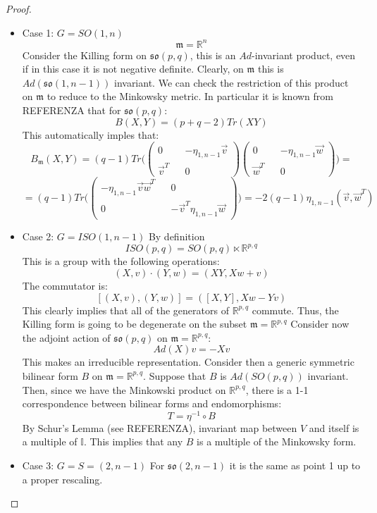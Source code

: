 \documentclass[12pt,a4paper]{report}
\theoremstyle{definition}
\theoremstyle{Theorem}
\theoremstyle{definition}
\theoremstyle{definition}
\begin{document}
	\begin{proof}
		\begin{itemize}
			\item Case 1: $G=SO(1,n)$\\
			$$\mathfrak{m}=\mathbb{R}^n$$
			Consider the Killing form on $\mathfrak{so}(p,q)$, this is an $Ad$-invariant product, even if in this case it is not negative definite. Clearly, on $\mathfrak{m}$ this is $Ad(\mathfrak{so}(1,n-1))$ invariant. We can check the restriction of this product on $\mathfrak{m}$ to reduce to the Minkowsky metric. In particular it is known from REFERENZA that for $\mathfrak{so}(p,q)$:
			$$B(X,Y)=(p+q-2)Tr(XY)$$
			This automatically imples that:
			$$B_\mathfrak{m}(X,Y)=(q-1)Tr\bigg(\begin{pmatrix}
				0 && -\eta_{1,n-1}\vec{v} \\
				\vec{v}^T && 0
			\end{pmatrix}\begin{pmatrix}
			0 && -\eta_{1,n-1}\vec{w} \\
			\vec{w}^T && 0
			\end{pmatrix}\bigg)=$$
			$$=(q-1)Tr\bigg(\begin{pmatrix}
				-\eta_{1,n-1}\vec{v}\vec{w}^T && 0 \\
				0 && -\vec{v}^T\eta_{1,n-1}\vec{w}
			\end{pmatrix}\bigg)=-2(q-1)\eta_{1,n-1}(\vec{v},\vec{w}^T)$$
			\item Case 2: $G=ISO(1,n-1)$
			By definition 
			$$ISO(p,q)=SO(p,q)\ltimes \mathbb{R}^{p,q}$$
			This is a group with the following operations:
			$$(X,v)\cdot (Y,w)=(XY,Xw+v)$$
			The commutator is:			$$[(X,v),(Y,w)]=([X,Y],Xw-Yv)$$
			This clearly implies that all of the generators of $\mathbb{R}^{p,q}$ commute. Thus, the Killing form is going to be degenerate on the subset $\mathfrak{m}=\mathbb{R}^{p,q}$
			Consider now the adjoint action of $\mathfrak{so}(p,q)$ on $\mathfrak{m}=\mathbb{R}^{p,q}$:
			$$Ad(X)v=-Xv$$
			This makes an irreducible representation. Consider then a generic symmetric bilinear form $B$ on $\mathfrak{m}=\mathbb{R}^{p,q}$. Suppose that $B$ is $Ad(SO(p,q))$ invariant. Then, since we have the Minkowski product on $\mathbb{R}^{p,q}$, there is a 1-1 correspondence between bilinear forms and endomorphisms:
			$$T=\eta^{-1}\circ B$$ 
			By Schur's Lemma (see REFERENZA), invariant map between $V$ and itself is a multiple of $\mathbb{I}$. This implies that any $B$ is a multiple of the Minkowsky form.
			\item Case 3: $G=S=(2,n-1)$
			For $\mathfrak{so}(2,n-1)$ it is the same as point 1 up to a proper rescaling.
		\end{itemize}
	\end{proof}
\end{document}
